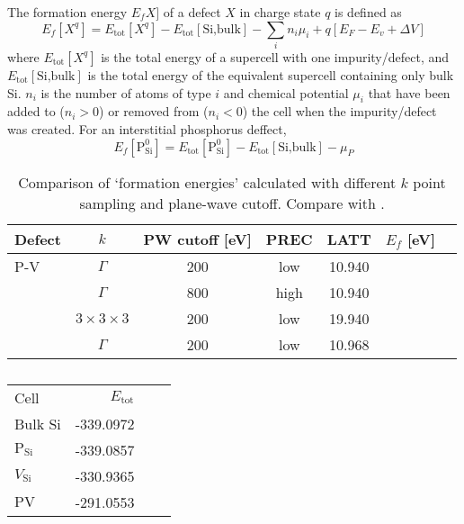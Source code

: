 \documentclass[11pt]{scrbook}   %
\begin{document}
The formation energy $E_fX]$ of a defect $X$ in charge state $q$ is defined as 
\begin{equation}
  E_f[X^q] = E_{\text{tot}}[X^q] - E_{\text{tot}}[\text{Si,bulk}] -  \sum_i n_i \mu_i + q [ E_F - E_v + \Delta V ]
\end{equation}
where $E_{\text{tot}}[X^q]$ is the total energy of a supercell with one impurity/defect,
and $E_{\text{tot}}[\text{Si,bulk}]$ is the total energy of the equivalent supercell containing only bulk Si. 
$n_i$ is the number of atoms of type $i$ and chemical potential $\mu_i$ that have been added to ($n_i>0$) or removed from ($n_i<0$) the cell when the impurity/defect was created. For an interstitial phosphorus deffect,
\begin{equation}
  E_f[\text{P}_{\text{Si}}^0] = E_{\text{tot}}[\text{P}_{\text{Si}}^0] - E_{\text{tot}}[\text{Si,bulk}] - \mu_P
\end{equation}


\begin{table}[htbp]
  \centering
  \begin{tabular}{lcccccc}\toprule
    Defect  & $k$                   & PW cutoff [eV]    & PREC  & LATT      & $E_f$ [eV]    \\\midrule
    P-V     & $\Gamma$              & 200               & low   & 10.940    &               \\
            & $\Gamma$              & 800               & high  & 10.940    &               \\
            & $3\times 3\times 3$   & 200               & low   & 19.940    &               \\
            & $\Gamma$              & 200               & low   & 10.968    &               \\\bottomrule
  \end{tabular}
  \caption{Comparison of `formation energies' calculated with different $k$ point sampling and 
  plane-wave cutoff. Compare with \cite[p. 3]{Sahli:2009}.}
\end{table}

\begin{table}[htbp]
  \centering
  \begin{tabular}{lrrr}
    Cell                        & $E_{\text{tot}}$  \\ 
    Bulk Si                     & -339.0972         \\
    $\text{P}_{\text{Si}}$      & -339.0857         \\
    $V_{\text{Si}}$             & -330.9365         \\
    $\text{PV}$                 & -291.0553         \\
  \end{tabular}
  \caption{}
\end{table}
\end{document}
